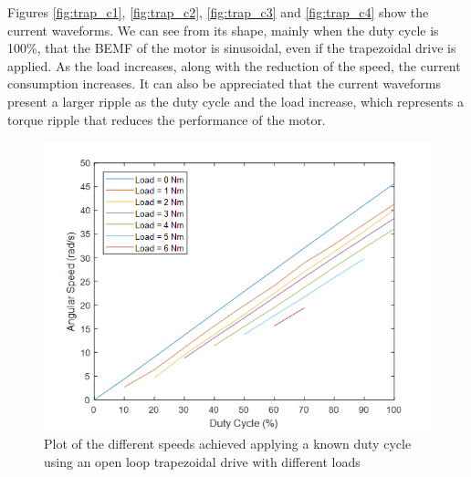 Figures \ref{fig:trap_c1}, \ref{fig:trap_c2}, \ref{fig:trap_c3} and \ref{fig:trap_c4} show the current waveforms. We can see from its shape, mainly when the duty cycle is 100\%, that the \ac{BEMF} of the motor is sinusoidal, even if the trapezoidal drive is applied. As the load increases, along with the reduction of the speed, the current consumption increases. It can also be appreciated that the current waveforms present a larger ripple as the duty cycle and the load increase, which represents a torque ripple that reduces the performance of the motor.

\vfill
\begin{figure}[htbp]
\centering
\includegraphics[width=\textwidth]{Images/plots/plot_1.png} 
\caption[Angular Speed vs Duty Cycle at Different Loads]{Plot of the different speeds achieved applying a known duty cycle using an open loop trapezoidal drive with different loads}
\label{fig:plot1}
\end{figure}
\vfill

